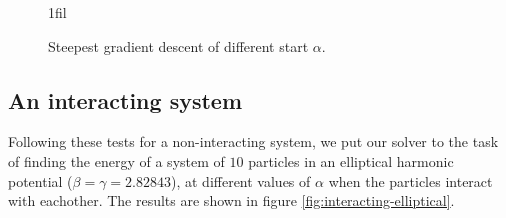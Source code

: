 \documentclass[
]{article}
\makeatletter
\newcommand*{\centerfloat}{%
  \parindent \z@
  \leftskip \z@ \@plus 1fil \@minus \textwidth
  \rightskip\leftskip
  \parfillskip \z@skip}
\makeatother
\begin{document}
\begin{figure}[ht]%
  \centerfloat
  \captionsetup[subfigure]{labelformat=empty}
  \caption{Steepest gradient descent of different start $\alpha$.}
  \label{fig:sgd-alphas}
\end{figure}

\FloatBarrier

\hypertarget{an-interacting-system}{%
\subsection{An interacting system}\label{an-interacting-system}}

Following these tests for a non-interacting system, we put our solver to
the task of finding the energy of a system of \(10\) particles in an
elliptical harmonic potential (\(\beta = \gamma = 2.82843\)), at
different values of \(\alpha\) when the particles interact with
eachother. The results are shown in figure
\ref{fig:interacting-elliptical}.
\end{document}
